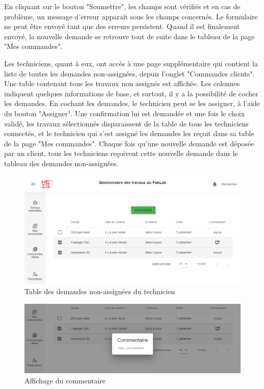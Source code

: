 \documentclass[
    iai, %
    eai, %
]{heig-tb}
\begin{document}
En cliquant sur le bouton "Soumettre", les champs sont vérifiés et en cas de problème, un message d'erreur apparait sous les champs concernés.
Le formulaire ne peut être envoyé tant que des erreurs persistent. Quand il est finalement envoyé, la nouvelle demande se retrouve tout de suite dans le tableau de la page "Mes commandes".

Les techniciens, quant à eux, ont accès à une page supplémentaire qui contient la liste de toutes les demandes non-assignées, depuis l'onglet "Commandes clients".
Une table contenant tous les travaux non assignés est affichée. Les colonnes indiquent quelques informations de base, et surtout, il y a la possibilité de cocher les demandes. En cochant les demandes, le technicien peut se les assigner, à l'aide du bouton "Assigner". Une confirmation lui est demandée et une fois le choix validé, les travaux sélectionnés disparaissent de la table de tous les techniciens connectés, et le technicien qui s'est assigné les demandes les reçoit dans sa table de la page "Mes commandes".
Chaque fois qu'une nouvelle demande est déposée par un client, tous les techniciens reçoivent cette nouvelle demande dans le tableau des demandes non-assignées.

\begin{figure}[h]
  \includegraphics[width=14cm]{ui_alljobs_page.PNG}
  \caption{Table des demandes non-assignées du technicien}
\end{figure}

\begin{figure}[h]
  \includegraphics[width=14cm]{ui_alljobs_comment.PNG}
  \caption{Affichage du commentaire}
\end{figure}
\end{document}

